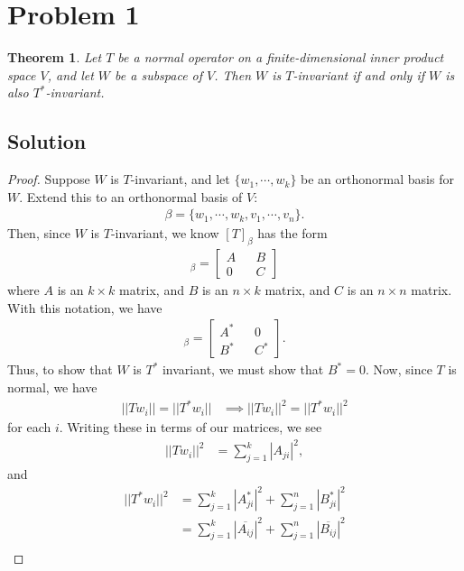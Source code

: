 \documentclass[10pt,a4paper]{article}
\author{Jeremiah Givens}
\newtheorem{theorem}{Theorem}
\theoremstyle{definition}
\begin{document}
\section*{Problem 1}
\begin{theorem}
Let $T$ be a normal operator on a finite-dimensional inner product space $V$,
and let $W$ be a subspace of $V$. Then $W$ is $T$-invariant if and only if
$W$ is also $T^*$-invariant.
\end{theorem}

\subsection*{Solution}
\begin{proof}
Suppose $W$ is $T$-invariant, and let $\{w_1, \cdots, w_k \}$ be an orthonormal basis for $W$. Extend this to an orthonormal basis of $V$:
\begin{align*}
\beta = \{w_1, \cdots, w_k, v_1, \cdots, v_n \}.
\end{align*}
Then, since $W$ is $T$-invariant, we know $[T]_\beta$ has the form
\begin{align*}
[T]_\beta = \begin{bmatrix}
A && B\\
0 && C
\end{bmatrix}
\end{align*}
where $A$ is an $k \times k$ matrix, and $B$ is an $n \times k$ matrix, and $C$ is an $n \times n$ matrix. With this notation, we have
\begin{align*}
[T^*]_\beta = \begin{bmatrix}
A^* && 0\\
B^* && C^*
\end{bmatrix}.
\end{align*}
Thus, to show that $W$ is $T^*$ invariant, we must show that $B^* = 0$. Now, since $T$ is normal, we have
\begin{align*}
||Tw_i|| = ||T^* w_i|| &\implies ||Tw_i||^2 = ||T^* w_i||^2
\end{align*}
for each $i$. Writing these in terms of our matrices, we see
\begin{align*}
||Tw_i||^2 &= \sum_{j = 1}^k |A_{ji}|^2,
\end{align*}
and
\begin{align*}
||T^*w_i||^2 &= \sum_{j = 1}^k |A^*_{ji}|^2 + \sum_{j = 1}^n |B^*_{ji}|^2\\
&= \sum_{j = 1}^k |\overline{A_{ij}}|^2 + \sum_{j = 1}^n |\overline{B_{ij}}|^2\\

\end{align*}
\end{proof}
\end{document}
